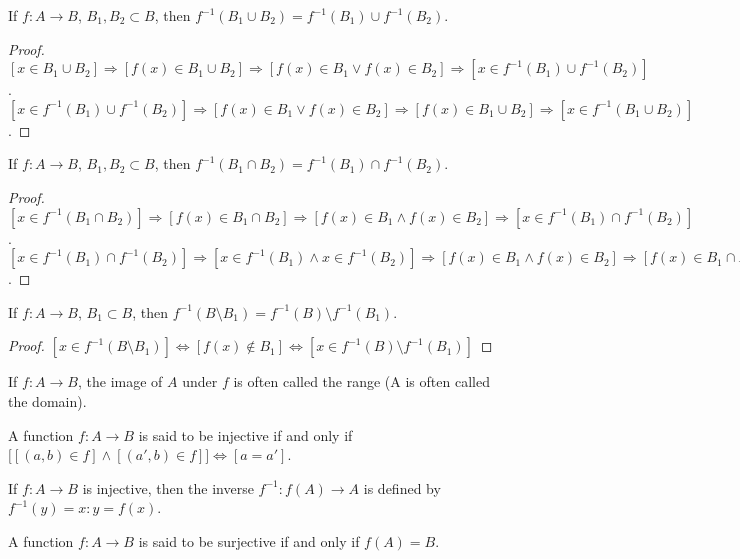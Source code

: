 \documentclass[crop=false,class=book]{standalone}
\begin{document}
\begin{theorem}
If $f:A\rightarrow B$, $B_1,B_2\subset B$, then $f^{-1}(B_1\cup B_2) = f^{-1}(B_1)\cup f^{-1}(B_2)$.
\end{theorem}
\begin{proof}
$[x\in B_1\cup B_2]\Rightarrow [f(x)\in B_1\cup B_2]\Rightarrow [f(x)\in B_1\lor f(x)\in B_2]\Rightarrow [x\in f^{-1}(B_1)\cup f^{-1}(B_2)]$. $[x \in f^{-1}(B_1)\cup f^{-1}(B_2)]\Rightarrow [f(x)\in B_1\lor f(x) \in B_2]\Rightarrow [f(x) \in B_1\cup B_2]\Rightarrow [x\in f^{-1}(B_1\cup B_2)]$.
\end{proof}
\begin{theorem}
If $f:A\rightarrow B$, $B_1,B_2\subset B$, then $f^{-1}(B_1\cap B_2) = f^{-1}(B_1)\cap f^{-1}(B_2)$.
\end{theorem}
\begin{proof}
$[x\in f^{-1}(B_1\cap B_2)]\Rightarrow [f(x) \in B_1 \cap B_2]\Rightarrow [f(x)\in B_1\land f(x) \in B_2 ]\Rightarrow [x\in f^{-1}(B_1)\cap f^{-1}(B_2)]$. $[x\in f^{-1}(B_1)\cap f^{-1}(B_2)]\Rightarrow [x\in f^{-1}(B_1)\land x\in f^{-1}(B_2)]\Rightarrow [f(x) \in B_1\land f(x) \in B_2]\Rightarrow [f(x)\in B_1\cap B_2]\Rightarrow [x\in f^{-1}(B_1\cap B_2)]$.
\end{proof}
\begin{theorem}
If $f:A\rightarrow B$, $B_1 \subset B$, then $f^{-1}(B\setminus B_1) = f^{-1}(B)\setminus f^{-1}(B_1)$.
\end{theorem}
\begin{proof}
$[x\in f^{-1}(B\setminus B_1)]\Leftrightarrow [f(x)\notin B_1]\Leftrightarrow [x\in f^{-1}(B)\setminus f^{-1}(B_1)]$
\end{proof}
\begin{remark}
If $f:A\rightarrow B$, the image of $A$ under $f$ is often called the range (A is often called the domain).
\end{remark}
\begin{definition}
A function $f:A\rightarrow B$ is said to be injective if and only if $\big[[(a,b)\in f]\land[(a',b)\in f]\big]\Leftrightarrow [a=a']$.
\end{definition}
\begin{definition}
If $f:A\rightarrow B$ is injective, then the inverse $f^{-1}:f(A)\rightarrow A$ is defined by $f^{-1}(y)=x:y=f(x)$.
\end{definition}
\begin{definition}
A function $f:A\rightarrow B$ is said to be surjective if and only if $f(A) = B$.
\end{definition}
\end{document}
